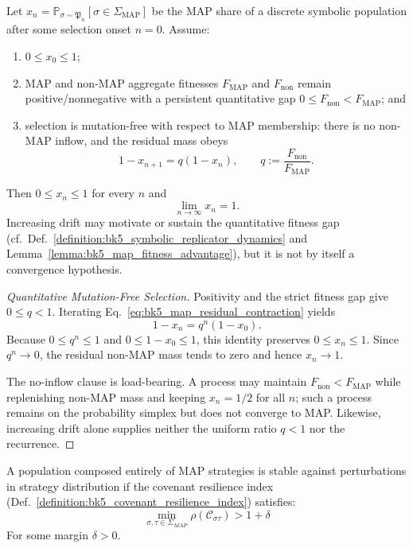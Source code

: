 \begin{corollary}
\label{corollary:bk5_convergence_to_map}
Let $x_n=\mathbb{P}_{\sigma\sim\mathfrak{P}_n}
[\sigma\in\Sigma_{\mathrm{MAP}}]$ be the MAP share of a discrete symbolic
population after some selection onset $n=0$.  Assume:
\begin{enumerate}
\item $0\leq x_0\leq1$;
\item MAP and non-MAP aggregate fitnesses $F_{\mathrm{MAP}}$ and
$F_{\mathrm{non}}$ remain positive/nonnegative with a persistent quantitative
gap $0\leq F_{\mathrm{non}}<F_{\mathrm{MAP}}$; and
\item selection is mutation-free with respect to MAP membership: there is no
non-MAP inflow, and the residual mass obeys
\begin{equation}
 1-x_{n+1}=q(1-x_n),\qquad
 q:=\frac{F_{\mathrm{non}}}{F_{\mathrm{MAP}}}.
 \label{eq:bk5_map_residual_contraction}
\end{equation}
\end{enumerate}
Then $0\leq x_n\leq1$ for every $n$ and
\begin{equation}
 \lim_{n\to\infty}x_n=1.
\end{equation}
Increasing drift may motivate or sustain the quantitative fitness gap
(cf.~Def.~\ref{definition:bk5_symbolic_replicator_dynamics} and
Lemma~\ref{lemma:bk5_map_fitness_advantage}), but it is not by itself a
convergence hypothesis.
\end{corollary}
\begin{proof}[Quantitative Mutation-Free Selection]
\label{proof:bk5_map_fitness_threshold}
Positivity and the strict fitness gap give $0\leq q<1$.  Iterating
Eq.~\eqref{eq:bk5_map_residual_contraction} yields
\[
 1-x_n=q^n(1-x_0).
\]
Because $0\leq q^n\leq1$ and $0\leq1-x_0\leq1$, this identity preserves
$0\leq x_n\leq1$.  Since $q^n\to0$, the residual non-MAP mass tends to zero
and hence $x_n\to1$.

The no-inflow clause is load-bearing.  A process may maintain
$F_{\mathrm{non}}<F_{\mathrm{MAP}}$ while replenishing non-MAP mass and keeping
$x_n=1/2$ for all $n$; such a process remains on the probability simplex but
does not converge to MAP.  Likewise, increasing drift alone supplies neither
the uniform ratio $q<1$ nor the recurrence.
\end{proof}
\begin{lemma}
\label{lemma:bk5_map_population_stability}
A population composed entirely of MAP strategies is stable against perturbations in strategy distribution if the covenant resilience index (Def.~\ref{definition:bk5_covenant_resilience_index}) satisfies:
\begin{equation}
\min_{\sigma, \tau \in \Sigma_{MAP}} \rho(\mathcal{C}_{\sigma\tau}) > 1 + \delta
\end{equation}
For some margin $\delta > 0$.
\end{lemma}
